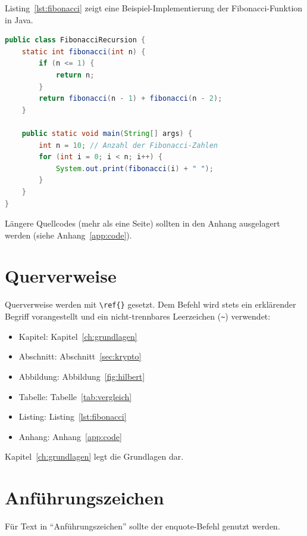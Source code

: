 \documentclass[
  12pt,       %
  a4paper,    %
  twoside,    %
  openright,  %
]{book}
\begin{document}
Listing~\ref{lst:fibonacci} zeigt eine Beispiel-Implementierung der Fibonacci-Funktion in Java.

\begin{lstlisting}[language=Java,
                   caption={Fibonacci-Funktion mit Rekursion},
                   label={lst:fibonacci}]
public class FibonacciRecursion {
    static int fibonacci(int n) {
        if (n <= 1) {
            return n;
        }
        return fibonacci(n - 1) + fibonacci(n - 2);
    }

    public static void main(String[] args) {
        int n = 10; // Anzahl der Fibonacci-Zahlen
        for (int i = 0; i < n; i++) {
            System.out.print(fibonacci(i) + " ");
        }
    }
}
\end{lstlisting}

Längere Quellcodes (mehr als eine Seite) sollten in den Anhang
ausgelagert werden (siehe Anhang~\ref{app:code}).

\section{Querverweise}
\label{sec:querverweise}

Querverweise werden mit \verb|\ref{}| gesetzt. Dem Befehl wird
stets ein erklärender Begriff vorangestellt und ein
nicht-trennbares Leerzeichen (\verb|~|) verwendet:

\begin{itemize}
  \item Kapitel: Kapitel~\ref{ch:grundlagen}
  \item Abschnitt: Abschnitt~\ref{sec:krypto}
  \item Abbildung: Abbildung~\ref{fig:hilbert}
  \item Tabelle: Tabelle~\ref{tab:vergleich}
  \item Listing: Listing~\ref{lst:fibonacci}
  \item Anhang: Anhang~\ref{app:code}
\end{itemize}

Kapitel~\ref{ch:grundlagen} legt die Grundlagen dar.

\section{Anführungszeichen}
\label{sec:anführungszeichen}

Für Text in \enquote{Anführungszeichen} sollte der enquote-Befehl genutzt werden.

\end{document}

